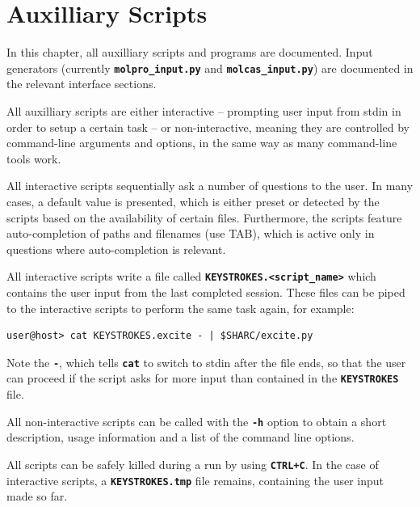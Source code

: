 \documentclass[a4paper,11pt,DIV=15,openany,twoside=false]{scrbook}
\newcommand{\ttt}[1]{\textbf{\texttt{#1}}}
\begin{document}

\chapter{Auxilliary Scripts}\label{chap:aux}

In this chapter, all auxilliary scripts and programs are documented. Input generators (currently \ttt{molpro\_input.py} and \ttt{molcas\_input.py}) are documented in the relevant interface sections.

All auxilliary scripts are either interactive -- prompting user input from stdin in order to setup a certain task -- or non-interactive, meaning they are controlled by command-line arguments and options, in the same way as many command-line tools work.

All interactive scripts sequentially ask a number of questions to the user. In many cases, a default value is presented, which is either preset or detected by the scripts based on the availability of certain files. Furthermore, the scripts feature auto-completion of paths and filenames (use TAB), which is active only in questions where auto-completion is relevant.

All interactive scripts write a file called \ttt{KEYSTROKES.<script\_name>} which contains the user input from the last completed session. These files can be piped to the interactive scripts to perform the same task again, for example:
\begin{verbatim}
user@host> cat KEYSTROKES.excite - | $SHARC/excite.py
\end{verbatim}
Note the \ttt{-}, which tells \ttt{cat} to switch to stdin after the file ends, so that the user can proceed if the script asks for more input than contained in the \ttt{KEYSTROKES} file.

All non-interactive scripts can be called with the \ttt{-h} option to obtain a short description, usage information and a list of the command line options.

All scripts can be safely killed during a run by using \ttt{CTRL+C}. In the case of interactive scripts, a \ttt{KEYSTROKES.tmp} file remains, containing the user input made so far.
\end{document}
